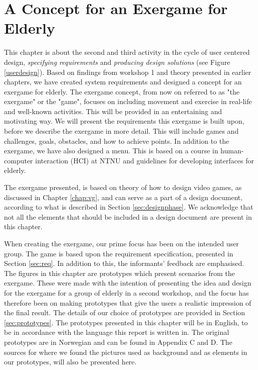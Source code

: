 \chapter{A Concept for an Exergame for Elderly}
\label{chap:concept}
This chapter is about the second and third activity in the cycle of user centered design, \emph{specifying requirements} and \emph{producing design solutions} (see Figure \ref{userdesign}). Based on findings from workshop 1 and theory presented in earlier chapters, we have created system requirements and designed a concept for an exergame for elderly. The exergame concept, from now on referred to as "the exergame" or the "game", focuses on including movement and exercise in real-life and well-known activities. This will be provided in an entertaining and motivating way. We will present the requirements this exergame is built upon, before we describe the exergame in more detail. This will include games and challenges, goals, obstacles, and how to achieve points. In addition to the exergame, we have also designed a menu. This is based on a course in human-computer interaction (HCI) at NTNU and guidelines for developing interfaces for elderly. 

The exergame presented, is based on theory of how to design video games, as discussed in Chapter \ref{chap:vg}, and can serve as a part of a design document, according to what is described in Section \ref{sec:designphase}. We acknowledge that not all the elements that should be included in a design document are present in this chapter.

When creating the exergame, our prime focus has been on the intended user group. The game is based upon the requirement specification, presented in Section \ref{sec:req}. In addition to this, the informants' feedback are emphasised. The figures in this chapter are prototypes which present scenarios from the exergame. These were made with the intention of presenting the idea and design for the exergame for a group of elderly in a second workshop, and the focus has therefore been on making prototypes that give the users a realistic impression of the final result. The details of our choice of prototypes are provided in Section \ref{sec:prototypes}. The prototypes presented in this chapter will be in English, to be in accordance with the language this report is written in. The original prototypes are in Norwegian and can be found in Appendix C and D. The sources for where we found the pictures used as background and as elements in our prototypes, will also be presented here. 

